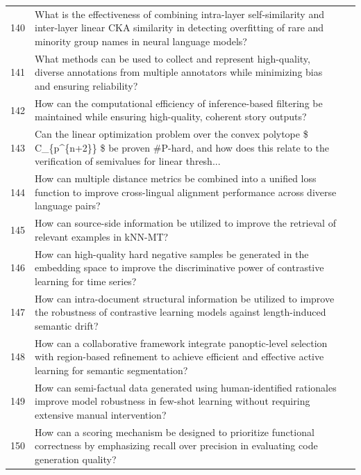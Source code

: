 \begin{longtable}{p{0.8cm}p{9cm}p{2.5cm}}
140 & What is the effectiveness of combining intra-layer self-similarity and inter-layer linear CKA similarity in detecting overfitting of rare and minority group names in neural language models? & \cite{10.18653/v1/2021.emnlp-main.41} \\
141 & What methods can be used to collect and represent high-quality, diverse annotations from multiple annotators while minimizing bias and ensuring reliability? & \cite{10.1609/aaai.v37i6.25840} \\
142 & How can the computational efficiency of inference-based filtering be maintained while ensuring high-quality, coherent story outputs? & \cite{10.18653/v1/2022.findings-emnlp.520} \\
143 & Can the linear optimization problem over the convex polytope \$ C\_\{p\textasciicircum{}\{n+2\}\} \$ be proven \#P-hard, and how does this relate to the verification of semivalues for linear thresh... & \cite{10.1609/aaai.v33i01.33011869} \\
144 & How can multiple distance metrics be combined into a unified loss function to improve cross-lingual alignment performance across diverse language pairs? & \cite{10.18653/v1/2021.findings-acl.276} \\
145 & How can source-side information be utilized to improve the retrieval of relevant examples in kNN-MT? & \cite{10.18653/v1/2023.emnlp-main.503} \\
146 & How can high-quality hard negative samples be generated in the embedding space to improve the discriminative power of contrastive learning for time series? & \cite{10.1609/aaai.v38i12.29299} \\
147 & How can intra-document structural information be utilized to improve the robustness of contrastive learning models against length-induced semantic drift? & \cite{10.18653/v1/2023.emnlp-main.86} \\
148 & How can a collaborative framework integrate panoptic-level selection with region-based refinement to achieve efficient and effective active learning for semantic segmentation? & \cite{10.1609/aaai.v36i2.20107} \\
149 & How can semi-factual data generated using human-identified rationales improve model robustness in few-shot learning without requiring extensive manual intervention? & \cite{10.18653/v1/2022.acl-long.481} \\
150 & How can a scoring mechanism be designed to prioritize functional correctness by emphasizing recall over precision in evaluating code generation quality? & \cite{10.18653/v1/2023.emnlp-main.859} \\
\end{longtable}


